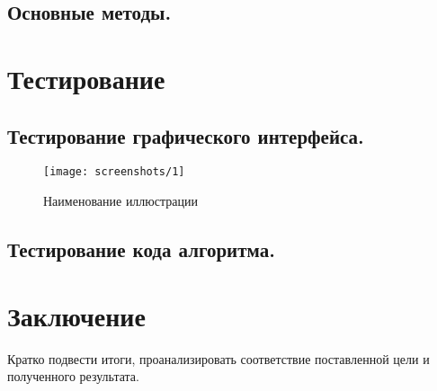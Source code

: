 \subsection{Основные методы.}

\newpage
\section{Тестирование}

\subsection{Тестирование графического интерфейса.}

\begin{figure}[h!]
	\centering
	\texttt{[image: screenshots/1]}
	\caption{Наименование иллюстрации}
	\label{fig:my-unique-label}
\end{figure}

\subsection{Тестирование кода алгоритма.}

\newpage
\section*{Заключение}
Кратко подвести итоги, проанализировать соответствие поставленной цели и полученного результата.

\newpage

